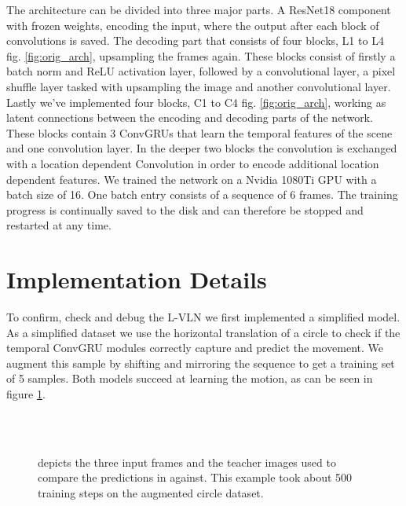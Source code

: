 \documentclass[runningheads,a4paper]{llncs}
\begin{document}
The architecture can be divided into three major parts. A ResNet18 component with frozen weights, encoding the input, where the output after each block of convolutions is saved. The decoding part that consists of four blocks, L1 to L4 fig. \ref{fig:orig_arch}, upsampling the frames again. These blocks consist of firstly a batch norm and ReLU activation layer, followed by a convolutional layer, a pixel shuffle layer tasked with upsampling the image and another convolutional layer. Lastly we’ve implemented four blocks, C1 to C4 fig. \ref{fig:orig_arch}, working as latent connections between the encoding and decoding parts of the network. These blocks contain 3 ConvGRUs that learn the temporal features of the scene and one convolution layer. In the deeper two blocks the convolution is exchanged with a location dependent Convolution \cite{kurkova_location_2018} in order to encode additional location dependent features. We trained the network on a Nvidia 1080Ti GPU with a batch size of 16. One batch entry consists of a sequence of 6 frames. The training progress is continually saved to the disk and can therefore be stopped and restarted at any time.

\section{Implementation Details}
To confirm, check and debug the L-VLN we first implemented a simplified model. As a simplified dataset we use the horizontal translation of a circle to check if the temporal ConvGRU modules correctly capture and predict the movement. We augment this sample by shifting and mirroring the sequence to get a training set of 5 samples. Both models succeed at learning the motion, as can be seen in figure \ref{fig:moving_ball}.
\begin{figure}[htb]
\captionsetup[subfigure]{width=0.2\textwidth}
 \advance\leftskip-4cm
  \ \subfloat[\label{label-1}]{} \\[\topskip]
  \ \subfloat[\label{label-2}]{}
  \caption{ \protect{} depicts the three input frames and the teacher images used to compare the predictions in \protect{} against. This example took about 500 training steps on the augmented circle dataset.}
  \label{fig:moving_ball}
\end{figure}
\end{document}

